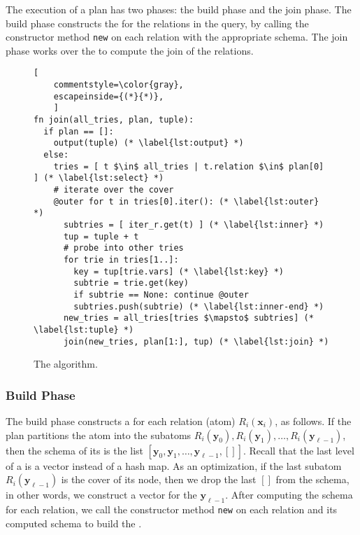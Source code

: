 The execution of a \FJ plan has two phases: the build phase and the
join phase.  The build phase constructs the \GHTs for the relations in
the query, by calling the constructor method \lstinline|new| on each
relation with the appropriate schema.  The join phase works over the
\GHTs to compute the join of the relations.


\begin{figure}
  \begin{lstlisting}[
    commentstyle=\color{gray},
    escapeinside={(*}{*)},
    ]
fn join(all_tries, plan, tuple):
  if plan == []:
    output(tuple) (* \label{lst:output} *)
  else:
    tries = [ t $\in$ all_tries | t.relation $\in$ plan[0] ] (* \label{lst:select} *)
    # iterate over the cover
    @outer for t in tries[0].iter(): (* \label{lst:outer} *)
      subtries = [ iter_r.get(t) ] (* \label{lst:inner} *)
      tup = tuple + t
      # probe into other tries
      for trie in tries[1..]:     
        key = tup[trie.vars] (* \label{lst:key} *)
        subtrie = trie.get(key)
        if subtrie == None: continue @outer
        subtries.push(subtrie) (* \label{lst:inner-end} *)
      new_tries = all_tries[tries $\mapsto$ subtries] (* \label{lst:tuple} *)
      join(new_tries, plan[1:], tup) (* \label{lst:join} *)
\end{lstlisting}
  \caption{The \FJ algorithm.}
  \label{fig:fj-algo}
\end{figure}

\subsubsection*{Build Phase}
The build phase constructs a \GHT for each relation (atom)
$R_i(\bm x_i)$, as follows.  If the plan partitions the atom into the
subatoms $R_i(\bm y_0), R_i(\bm y_1), \ldots, R_i(\bm y_{\ell-1})$,
then the schema of its \GHT is the list
$[\bm y_0, \bm y_1, \ldots, \bm y_{\ell-1}, []]$.  Recall that the
last level of a \GHT is a vector instead of a hash map. As an
optimization, if the last subatom $R_i(\bm y_{\ell-1})$ is the cover
of its node, then we drop the last $[]$ from the schema, in other
words, we construct a vector for the $\bm y_{\ell-1}$.  After
computing the schema for each relation, we call the constructor method
\lstinline|new| on each relation and its computed schema to build the
\GHTs.

